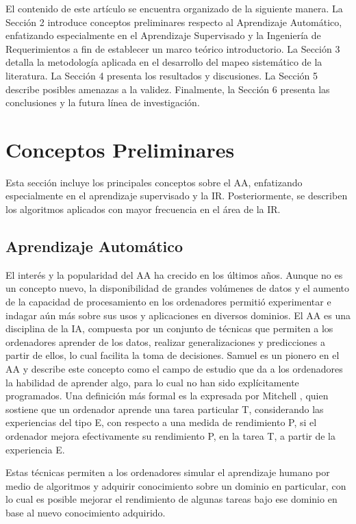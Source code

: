 \documentclass[journal]{IEEEtran}
\begin{document}
El contenido de este artículo se encuentra organizado de la siguiente manera. La Sección 2 introduce conceptos preliminares respecto al Aprendizaje Automático, enfatizando especialmente en el Aprendizaje Supervisado y la Ingeniería de Requerimientos a fin de establecer un marco teórico introductorio. La Sección 3 detalla la metodología aplicada en el desarrollo del mapeo sistemático de la literatura. La Sección 4 presenta los resultados y discusiones. La Sección 5 describe posibles amenazas a la validez. Finalmente, la Sección 6 presenta las conclusiones y la futura línea de investigación.  

\section{Conceptos Preliminares}

Esta sección incluye los principales conceptos sobre el AA, enfatizando especialmente en el aprendizaje supervisado y la IR. Posteriormente, se describen los algoritmos aplicados con mayor frecuencia en el área de la IR.

\subsection{Aprendizaje Automático}

El interés y la popularidad del AA ha crecido en los últimos años. Aunque no es un concepto nuevo, la disponibilidad de grandes volúmenes de datos y el aumento de la capacidad de procesamiento en los ordenadores permitió experimentar e indagar aún más sobre sus usos y aplicaciones en diversos dominios.
El AA es una disciplina de la IA, compuesta por un conjunto de técnicas que permiten a los ordenadores aprender de los datos, realizar generalizaciones y predicciones a partir de ellos, lo cual facilita la toma de decisiones. Samuel \cite{samuel1959some} es un pionero en el AA y describe este concepto como el campo de estudio que da a los ordenadores la habilidad de aprender algo, para lo cual no han sido explícitamente programados. Una definición más formal es la expresada por Mitchell \cite{mitchell1997machine}, quien sostiene que un ordenador aprende una tarea particular T, considerando las experiencias del tipo E, con respecto a una medida de rendimiento P, si el ordenador mejora efectivamente su rendimiento P, en la tarea T, a partir de la experiencia E.

Estas técnicas permiten a los ordenadores simular el aprendizaje humano por medio de algoritmos y adquirir conocimiento sobre un dominio en particular, con lo cual es posible mejorar el rendimiento de algunas tareas bajo ese dominio en base al nuevo conocimiento adquirido.
\end{document}
